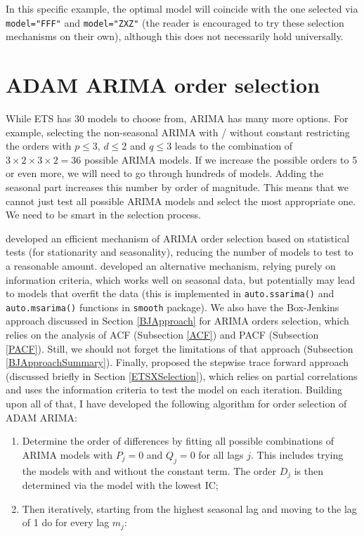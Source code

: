 \documentclass[
]{book}
\providecommand{\tightlist}{%
  \setlength{\itemsep}{0pt}\setlength{\parskip}{0pt}}
\theoremstyle{definition}
\theoremstyle{definition}
\theoremstyle{definition}
\theoremstyle{definition}
\theoremstyle{remark}
\begin{document}
In this specific example, the optimal model will coincide with the one selected via \texttt{model="FFF"} and \texttt{model="ZXZ"} (the reader is encouraged to try these selection mechanisms on their own), although this does not necessarily hold universally.

\hypertarget{ARIMASelection}{%
\section{ADAM ARIMA order selection}\label{ARIMASelection}}

While ETS has 30 models to choose from, ARIMA has many more options. For example, selecting the non-seasonal ARIMA with / without constant restricting the orders with \(p \leq 3\), \(d \leq 2\) and \(q \leq 3\) leads to the combination of \(3 \times 2 \times 3 \times 2 = 36\) possible ARIMA models. If we increase the possible orders to 5 or even more, we will need to go through hundreds of models. Adding the seasonal part increases this number by order of magnitude. This means that we cannot just test all possible ARIMA models and select the most appropriate one. We need to be smart in the selection process.

\citet{Hyndman2008Forecast} developed an efficient mechanism of ARIMA order selection based on statistical tests (for stationarity and seasonality), reducing the number of models to test to a reasonable amount. \citet{Svetunkov2019} developed an alternative mechanism, relying purely on information criteria, which works well on seasonal data, but potentially may lead to models that overfit the data (this is implemented in \texttt{auto.ssarima()} and \texttt{auto.msarima()} functions in \texttt{smooth} package). We also have the Box-Jenkins approach discussed in Section \ref{BJApproach} for ARIMA orders selection, which relies on the analysis of ACF (Subsection \ref{ACF}) and PACF (Subsection \ref{PACF}). Still, we should not forget the limitations of that approach (Subsection \ref{BJApproachSummary}). Finally, \citet{Sagaert2021} proposed the stepwise trace forward approach (discussed briefly in Section \ref{ETSXSelection}), which relies on partial correlations and uses the information criteria to test the model on each iteration. Building upon all of that, I have developed the following algorithm for order selection of ADAM ARIMA:

\begin{enumerate}
\def\labelenumi{\arabic{enumi}.}
\tightlist
\item
  Determine the order of differences by fitting all possible combinations of ARIMA models with \(P_j=0\) and \(Q_j=0\) for all lags \(j\). This includes trying the models with and without the constant term. The order \(D_j\) is then determined via the model with the lowest IC;
\item
  Then iteratively, starting from the highest seasonal lag and moving to the lag of 1 do for every lag \(m_j\):
\end{enumerate}
\end{document}
